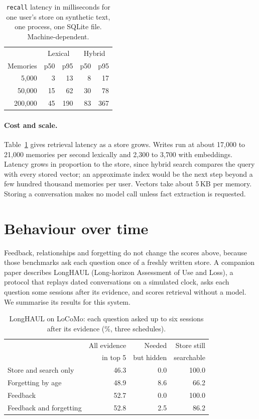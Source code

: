 \documentclass[11pt]{article}
\begin{document}
\begin{table}[t]
\centering
\small
\begin{tabular}{rrrrr}
\toprule
 & \multicolumn{2}{c}{Lexical} & \multicolumn{2}{c}{Hybrid} \\
Memories & p50 & p95 & p50 & p95 \\
\midrule
5{,}000 & 3 & 13 & 8 & 17 \\
50{,}000 & 15 & 62 & 30 & 78 \\
200{,}000 & 45 & 190 & 83 & 367 \\
\bottomrule
\end{tabular}
\caption{\texttt{recall} latency in milliseconds for one user's store
on synthetic text, one process, one SQLite file. Machine-dependent.}
\label{tab:scale}
\end{table}

\paragraph{Cost and scale.} Table~\ref{tab:scale} gives retrieval
latency as a store grows. Writes run at about 17{,}000 to 21{,}000
memories per second lexically and 2{,}300 to 3{,}700 with embeddings.
Latency grows in proportion to the store, since hybrid search compares
the query with every stored vector; an approximate index would be the
next step beyond a few hundred thousand memories per user. Vectors take
about 5\,KB per memory. Storing a conversation makes no model call
unless fact extraction is requested.

\section{Behaviour over time}

Feedback, relationships and forgetting do not change the scores above,
because those benchmarks ask each question once of a freshly written
store. A companion paper \citep{myelin2026longitudinal} describes
LongHAUL (Long-horizon Assessment of Use and Loss), a protocol that replays dated conversations on a simulated clock, asks
each question some sessions after its evidence, and scores retrieval
without a model. We summarise its results for this system.

\begin{table}[t]
\centering
\small
\begin{tabular}{lrrr}
\toprule
 & All evidence & Needed & Store still \\
 & in top 5 & but hidden & searchable \\
\midrule
Store and search only & 46.3 & 0.0 & 100.0 \\
Forgetting by age & 48.9 & 8.6 & 66.2 \\
Feedback & 52.7 & 0.0 & 100.0 \\
Feedback and forgetting & 52.8 & 2.5 & 86.2 \\
\bottomrule
\end{tabular}
\caption{LongHAUL on LoCoMo: each question asked up to six
sessions after its evidence (\%, three schedules).}
\label{tab:time}
\end{table}
\end{document}
